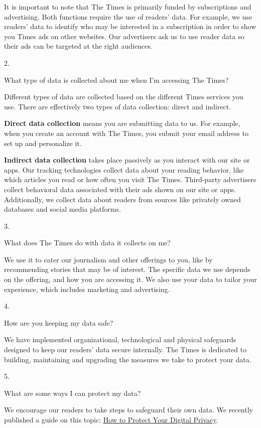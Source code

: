 It is important to note that The Times is primarily funded by
subscriptions and advertising. Both functions require the use of
readers' data. For example, we use readers' data to identify who may be
interested in a subscription in order to show you Times ads on other
websites. Our advertisers ask us to use reader data so their ads can be
targeted at the right audiences.

2.

What type of data is collected about me when I'm accessing The Times?

Different types of data are collected based on the different Times
services you use. There are effectively two types of data collection:
direct and indirect.

\textbf{Direct data collection} means you are submitting data to us. For
example, when you create an account with The Times, you submit your
email address to set up and personalize it.

\textbf{Indirect data collection} takes place passively as you interact
with our site or apps. Our tracking technologies collect data about your
reading behavior, like which articles you read or how often you visit
The Times. Third-party advertisers collect behavioral data associated
with their ads shown on our site or apps. Additionally, we collect data
about readers from sources like privately owned databases and social
media platforms.

3.

What does The Times do with data it collects on me?

We use it to cater our journalism and other offerings to you, like by
recommending stories that may be of interest. The specific data we use
depends on the offering, and how you are accessing it. We also use your
data to tailor your experience, which includes marketing and
advertising.

4.

How are you keeping my data safe?

We have implemented organizational, technological and physical
safeguards designed to keep our readers' data secure internally. The
Times is dedicated to building, maintaining and upgrading the measures
we take to protect your data.

5.

What are some ways I can protect my data?

We encourage our readers to take steps to safeguard their own data. We
recently published a guide on this topic:
\href{https://www.nytimes3xbfgragh.onion/guides/privacy-project/how-to-protect-your-digital-privacy}{How
to Protect Your Digital Privacy}.


